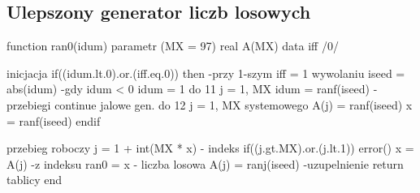 	\subsection{Ulepszony generator liczb losowych}
	
	\begin{code}
	function ran0(idum)
	parametr (MX = 97)
	real A(MX)
	data iff /0/
	
	                                     inicjacja
	if((idum.lt.0).or.(iff.eq.0)) then     -przy 1-szym
	    iff = 1                             wywolaniu
	    iseed = abs(idum)                  -gdy idum < 0
	    idum = 1
	    do 11 j = 1, MX
	        idum = ranf(iseed)             -przebiegi
	    continue                            jalowe gen.
	    do 12 j = 1, MX                     systemowego
	        A(j) = ranf(iseed)
	    x = ranf(iseed)
	endif
	
	\end{code}

	\begin{code}
	                                    przebieg roboczy
	j = 1 + int(MX * x)    - indeks
	if((j.gt.MX).or.(j.lt.1)) error()
	x = A(j)                               -z indeksu
	ran0 = x      - liczba losowa
	A(j) = ranj(iseed)                     -uzupelnienie
	return       tablicy
	end
	\end{code}

